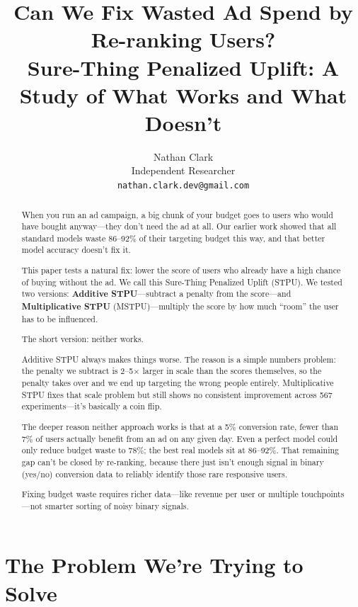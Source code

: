 \documentclass[10pt]{article}
\title{%
  \textbf{Can We Fix Wasted Ad Spend by Re-ranking Users?}\\[4pt]
  \large Sure-Thing Penalized Uplift: A Study of What Works and What Doesn't
}
\author{%
  Nathan Clark\\
  Independent Researcher\\
  \texttt{nathan.clark.dev@gmail.com}
}
\date{}
\begin{document}
\maketitle

\begin{abstract}
When you run an ad campaign, a big chunk of your budget goes to users who
would have bought anyway---they don't need the ad at all.
Our earlier work \citep{clark2025benchmarking} showed that all standard models
waste 86--92\% of their targeting budget this way, and that better model
accuracy doesn't fix it.

This paper tests a natural fix: lower the score of users who already have a
high chance of buying without the ad.  We call this Sure-Thing Penalized Uplift
(STPU).  We tested two versions:
\textbf{Additive STPU}---subtract a penalty from the score---and
\textbf{Multiplicative STPU} (MSTPU)---multiply the score by how much ``room''
the user has to be influenced.

The short version: neither works.

Additive STPU always makes things worse.  The reason is a simple numbers
problem: the penalty we subtract is 2--5$\times$ larger in scale than the
scores themselves, so the penalty takes over and we end up targeting the wrong
people entirely.  Multiplicative STPU fixes that scale problem but still shows
no consistent improvement across 567 experiments---it's basically a coin flip.

The deeper reason neither approach works is that at a 5\% conversion rate,
fewer than 7\% of users actually benefit from an ad on any given day.
Even a perfect model could only reduce budget waste to 78\%; the best real
models sit at 86--92\%.  That remaining gap can't be closed by re-ranking,
because there just isn't enough signal in binary (yes/no) conversion data to
reliably identify those rare responsive users.

Fixing budget waste requires richer data---like revenue per user or multiple
touchpoints---not smarter sorting of noisy binary signals.
\end{abstract}

\section{The Problem We're Trying to Solve}
\label{sec:intro}
\end{document}
